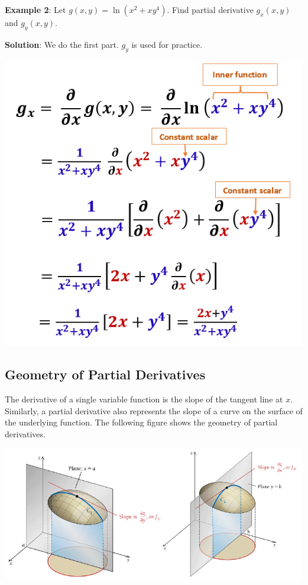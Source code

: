 \documentclass[
]{book}
\begin{document}
\hfill\break

\textbf{Example 2}: Let \(g(x,y) = \ln(x^2 + xy^4)\). Find partial derivative \(g_x(x,y)\) and \(g_y(x,y)\).

\textbf{Solution}: We do the first part. \(g_y\) is used for practice.

\begin{center}\includegraphics[width=0.65\linewidth]{img14/w14-partialExample02Part01} \end{center}

\hfill\break

\hypertarget{geometry-of-partial-derivatives}{%
\subsection{Geometry of Partial Derivatives}\label{geometry-of-partial-derivatives}}

The derivative of a single variable function is the slope of the tangent line at \(x\). Similarly, a partial derivative also represents the slope of a curve on the surface of the underlying function. The following figure shows the geometry of partial derivatives.

\begin{center}\includegraphics[width=0.95\linewidth]{img14/w14-geometryPartialDerivatives} \end{center}
\end{document}
